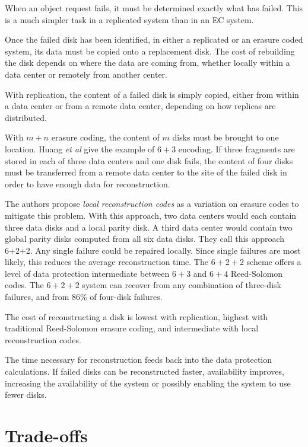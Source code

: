 \documentclass[11pt]{article}
\begin{document}
When an object request fails, it must be determined exactly what has failed. This is a much simpler task in a replicated system than in an EC system.

Once the failed disk has been identified, in either a replicated or an erasure coded system, its data must be copied onto a replacement disk. The cost of rebuilding the disk depends on where the data are coming from, whether locally within a data center or remotely from another center. 

With replication, the content of a failed disk is simply copied, either from within a data center or from a remote data center, depending on how replicas are distributed.

With $m+n$ erasure coding, the content of $m$ disks must be brought to one location. Huang \emph{et al} \cite{lrc} give the example of $6+3$ encoding. If three fragments are stored in each of three data centers and one disk fails, the content of four disks must be transferred from a remote data center to the site of the failed disk in order to have enough data for reconstruction. 

The authors propose \emph{local reconstruction codes} \cite{lrc} as a variation on erasure codes to mitigate this problem. With this approach, two data centers would each contain three data disks and a local parity disk. A third data center would contain two global parity disks computed from all six data disks. They call this approach 6+2+2. Any single failure could be repaired locally. Since single failures are most likely, this reduces the average reconstruction time. The $6+2+2$ scheme offers a level of data protection intermediate between $6+3$ and $6+4$ Reed-Solomon codes. The $6+2+2$ system can recover from any combination of three-disk failures, and from 86\% of four-disk failures.

The cost of reconstructing a disk is lowest with replication, highest with traditional Reed-Solomon erasure coding, and intermediate with local reconstruction codes.

The time necessary for reconstruction feeds back into the data protection calculations. If failed disks can be reconstructed faster, availability improves, increasing the availability of the system or possibly enabling the system to use fewer disks.


\section{Trade-offs}
\end{document}
